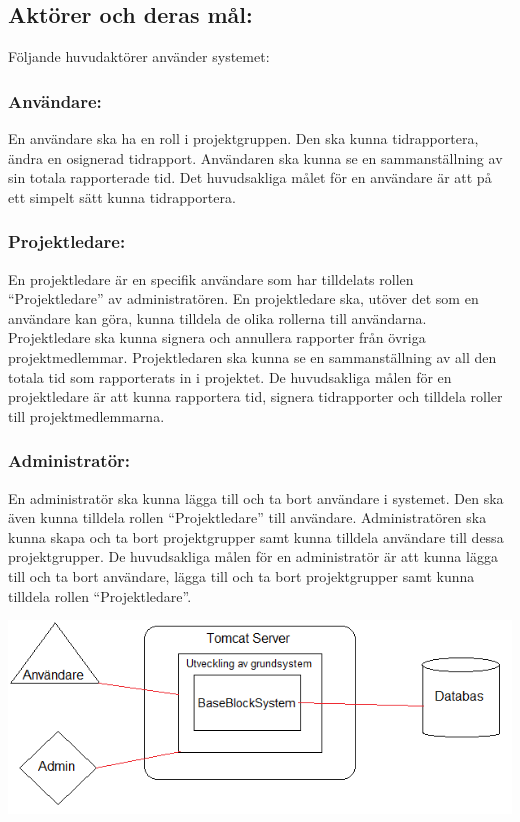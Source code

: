 \documentclass[paper=a4, fontsize=11pt,twoside]{article}
\begin{document}
	\subsection{Aktörer och deras mål:}
	Följande huvudaktörer använder systemet:
	\subsubsection{Användare:}
	En användare ska ha en roll i projektgruppen. Den ska kunna tidrapportera, ändra en osignerad tidrapport. Användaren ska kunna se en sammanställning av sin totala rapporterade tid. Det huvudsakliga målet för en användare är att på ett simpelt sätt kunna tidrapportera.
	\subsubsection{Projektledare:}
	En projektledare är en specifik användare som har tilldelats rollen “Projektledare” av administratören. En projektledare ska, utöver det som en användare kan göra, kunna tilldela de olika rollerna till användarna. Projektledare ska kunna signera och annullera rapporter från övriga projektmedlemmar. Projektledaren ska kunna se en sammanställning av all den totala tid som rapporterats in i projektet. De huvudsakliga målen för en projektledare är att kunna rapportera tid, signera tidrapporter och tilldela roller till projektmedlemmarna. 
	\subsubsection{Administratör:}
	En administratör ska kunna lägga till och ta bort användare i systemet. Den ska även kunna tilldela rollen “Projektledare” till användare. Administratören ska kunna skapa och ta bort projektgrupper samt kunna tilldela användare till dessa projektgrupper. De huvudsakliga målen för en administratör är att kunna lägga till och ta bort användare, lägga till och ta bort projektgrupper samt kunna tilldela rollen “Projektledare”.
	
	\includegraphics{kontextdiagram_SRS.png}
	
\end{document}
